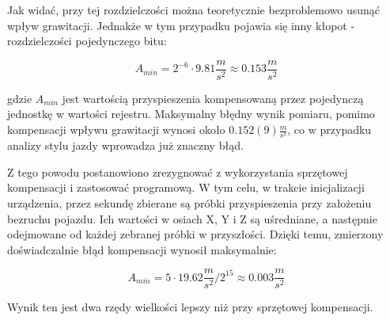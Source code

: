 Jak widać, przy tej rozdzielczości można teoretycznie bezproblemowo usunąć wpływ grawitacji. Jednakże w tym przypadku pojawia się inny kłopot - rozdzielczości pojedynczego bitu:

\begin{equation}
A_{min} = 2^{-6} \cdot 9.81\frac{m}{s^2} \approx 0.153 \frac{m}{s^2}
\end{equation}

gdzie $A_{min}$ jest wartością przyspieszenia kompensowaną przez pojedynczą jednostkę w wartości rejestru. Maksymalny błędny wynik pomiaru, pomimo kompensacji wpływu grawitacji wynosi około $0.152(9) \frac{m}{s^2}$, co w przypadku analizy stylu jazdy wprowadza już znaczny błąd. 

Z tego powodu postanowiono zrezygnować z wykorzystania sprzętowej kompensacji i zastosować programową. W tym celu, w trakcie inicjalizacji urządzenia, przez sekundę zbierane są próbki przyspieszenia przy założeniu bezruchu pojazdu. Ich wartości w osiach X, Y i Z są uśredniane, a następnie odejmowane od każdej zebranej próbki w przyszłości. Dzięki temu, zmierzony doświadczalnie błąd kompensacji wynosił maksymalnie:

 \begin{equation}
A_{min} = 5 \cdot 19.62\frac{m}{s^2}/{2^{15}} \approx 0.003 \frac{m}{s^2}
\end{equation}

Wynik ten jest dwa rzędy wielkości lepszy niż przy sprzętowej kompensacji.